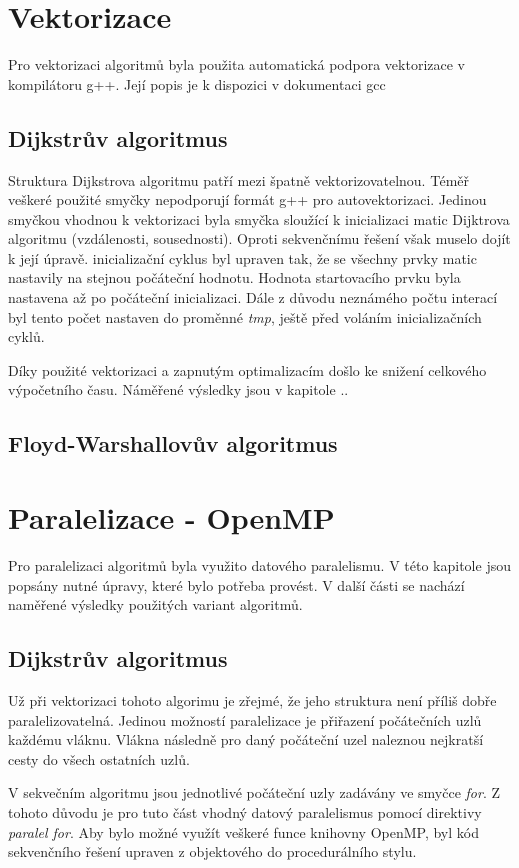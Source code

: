 \documentclass[a4paper,11pt]{article}
\begin{document}
\section{Vektorizace}
Pro vektorizaci algoritmů byla použita automatická podpora vektorizace v kompilátoru g++. Její popis je k dispozici v dokumentaci gcc

\subsection{Dijkstrův algoritmus}
Struktura Dijkstrova algoritmu patří mezi špatně vektorizovatelnou. Téměř veškeré použité smyčky nepodporují formát g++ pro 
autovektorizaci. Jedinou smyčkou vhodnou k vektorizaci byla smyčka sloužící k inicializaci matic Dijktrova algoritmu (vzdálenosti, sousednosti). Oproti sekvenčnímu řešení však
muselo dojít k její úpravě. inicializační cyklus byl
upraven tak, že se všechny prvky matic nastavily na stejnou počáteční hodnotu. Hodnota startovacího prvku byla nastavena až po počáteční inicializaci. Dále z důvodu neznámého
počtu interací byl tento počet nastaven do proměnné \textit{tmp}, ještě před voláním inicializačních cyklů.

Díky použité vektorizaci a zapnutým optimalizacím došlo ke snižení celkového výpočetního času. Náměřené výsledky jsou v kapitole ..
\subsection{Floyd-Warshallovův algoritmus}
\section{Paralelizace - OpenMP}
Pro paralelizaci algoritmů byla využito datového paralelismu. V této kapitole jsou popsány nutné úpravy, které bylo potřeba provést. V další části se nachází naměřené
výsledky použitých variant algoritmů.
\subsection{Dijkstrův algoritmus}
Už při vektorizaci tohoto algorimu je zřejmé, že jeho struktura není příliš dobře paralelizovatelná. Jedinou možností paralelizace je přiřazení počátečních uzlů každému vláknu. Vlákna následně
pro daný počáteční uzel naleznou nejkratší cesty do všech ostatních uzlů.

V sekvečním algoritmu jsou jednotlivé počáteční uzly zadávány ve smyčce \textit{for}. Z tohoto důvodu je pro tuto část vhodný datový paralelismus pomocí direktivy \textit{paralel for}.
Aby bylo možné využít veškeré funce knihovny OpenMP, byl kód sekvenčního řešení upraven z objektového do procedurálního stylu.
\end{document}
